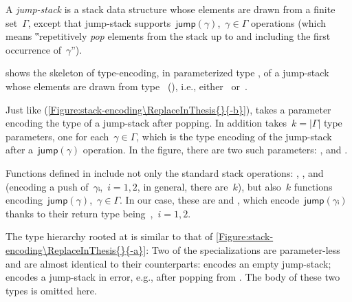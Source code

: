 A \emph{jump-stack} is a stack data structure whose elements are drawn from a finite set~$Γ$,
  except that jump-stack supports~$\textsf{jump}(γ)$,~$γ∈Γ$ operations
  (which means ‟repetitively \emph{pop} elements from the stack up
  to and including the first occurrence of~$γ$”).

 shows the skeleton of type-encoding, in parameterized type ,
  of a jump-stack whose elements are drawn from type~
  (), i.e., either~ or~.

Just like  (\cref{Figure:stack-encoding\ReplaceInThesis{}{-b}}),  takes
  a  parameter encoding the type of a jump-stack after popping.
In addition  takes~$k=|Γ|$ type parameters, one for each~$γ∈Γ$,
  which is the type encoding of the jump-stack after a~$\textsf{jump}(γ)$
  operation.
In the figure, there are two such parameters: , and
  .

Functions defined in  include not only the standard stack operations: ,
,  and~ (encoding a push of~$γᵢ$,~$i=1,2$, in general, there are~$k$),
but also~$k$ functions encoding~$\textsf{jump}(γ)$,~$γ∈Γ$.
In our case, these are  and ,
  which encode~$\textsf{jump}(γᵢ)$
  thanks to their return type being~,~$i=1,2$.

The type hierarchy rooted at  is similar to that of
\cref{Figure:stack-encoding\ReplaceInThesis{}{-a}}:
Two of the specializations are parameter-less and are
  almost identical to their 
  counterparts:
 encodes an empty jump-stack;  encodes a jump-stack in error,
e.g., after popping from .
The body of these two types is omitted here.

